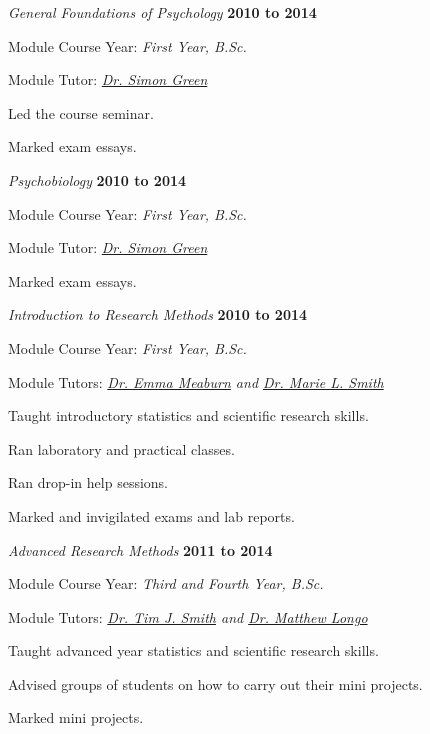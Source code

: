 \begin{outerlist}


\item[] \textit{General Foundations of Psychology}
         \hfill \textbf{2010 to 2014}
\begin{innerlist}
\item Module Course Year: \textit{First Year, B.Sc.}
\item Module Tutor: \href{http://www.bbk.ac.uk/psychology/our-staff/academic/simon-green/simon-green}{\textit{Dr. Simon Green}}\item Led the course seminar.
\item Marked exam essays.
\end{innerlist}

\item[] \textit{Psychobiology}
         \hfill \textbf{2010 to 2014}
\begin{innerlist}
\item Module Course Year: \textit{First Year, B.Sc.}
\item Module Tutor: \href{http://www.bbk.ac.uk/psychology/our-staff/academic/simon-green/simon-green}{\textit{Dr. Simon Green}}
\item Marked exam essays.
\end{innerlist}

\item[] \textit{Introduction to Research Methods}
         \hfill \textbf{2010 to 2014}
\begin{innerlist}
\item Module Course Year: \textit{First Year, B.Sc.}
\item Module Tutors: \textit{\href{http://www.bbk.ac.uk/psychology/our-staff/academic/emma-meaburn/emma-meaburn}{Dr. Emma Meaburn} and \href{http://www.bbk.ac.uk/psychology/our-staff/academic/marie-smith/marie-smith}{Dr. Marie L. Smith}}
\item Taught introductory statistics and scientific research skills.
\item Ran laboratory and practical classes.
\item Ran drop-in help sessions.
\item Marked and invigilated exams and lab reports.
\end{innerlist}

\item[] \textit{Advanced Research Methods}
         \hfill \textbf{2011 to 2014}
\begin{innerlist}
\item Module Course Year: \textit{Third and Fourth Year, B.Sc.}
\item Module Tutors: \textit{\href{http://www.bbk.ac.uk/psychology/our-staff/academic/tim-smith/tim-smith}{Dr. Tim J. Smith} and \href{http://www.bbk.ac.uk/psychology/our-staff/academic/matthew-longo}{Dr. Matthew Longo}}
\item Taught advanced year statistics and scientific research skills.
\item Advised groups of students on how to carry out their mini projects.
\item Marked mini projects.
\end{innerlist}


\end{outerlist}
